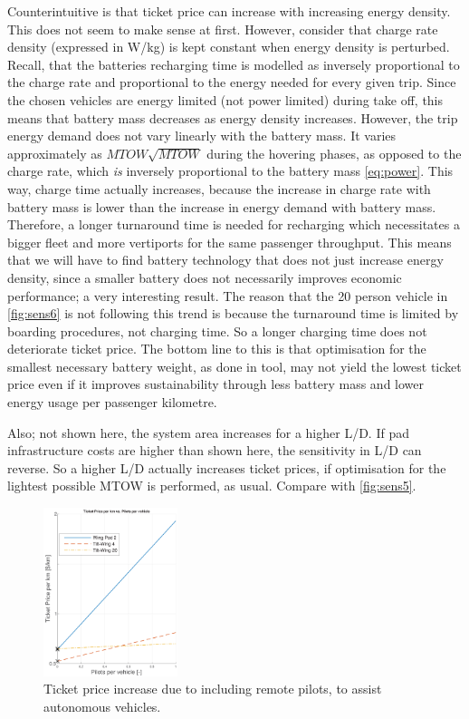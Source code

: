 Counterintuitive is that ticket price can increase with increasing energy density. This does not seem to make sense at first. However, consider that charge rate density (expressed in W/kg) is kept constant when energy density is perturbed. Recall, that the batteries recharging time is modelled as inversely proportional to the charge rate and proportional to the energy needed for every given trip. Since the chosen vehicles are energy limited (not power limited) during take off, this means that battery mass decreases as energy density increases. However, the trip energy demand does not vary linearly with the battery mass. It varies approximately as $MTOW\sqrt{MTOW}$ during the hovering phases, as opposed to the charge rate, which \emph{is} inversely proportional to the battery mass \autoref{eq:power}. This way, charge time actually increases, because the increase in charge rate with battery mass is lower than the increase in energy demand with battery mass. Therefore, a longer turnaround time is needed for recharging which necessitates a bigger fleet and more vertiports for the same passenger throughput. This means that we will have to find battery technology that does not just increase energy density, since a smaller battery does not necessarily improves economic performance; a very interesting result. The reason that the 20 person vehicle in \autoref{fig:sens6} is not following this trend is because the turnaround time is limited by boarding procedures, not charging time. So a longer charging time does not deteriorate ticket price. The bottom line to this is that optimisation for the smallest necessary battery weight, as done in tool, may not yield the lowest ticket price even if it improves sustainability through less battery mass and lower energy usage per passenger kilometre.

Also; not shown here, the system area increases for a higher L/D. If pad infrastructure costs are higher than shown here, the sensitivity in L/D can reverse. So a higher L/D actually increases ticket prices, if optimisation for the lightest possible MTOW is performed, as usual. Compare with \autoref{fig:sens5}.


\begin{figure}
    \centering
    \includegraphics[width=0.35\textwidth]{Figures/autonomous_TPrice_perkm.png}
    \captionsetup{justification=centering}
    \caption{Ticket price increase due to including remote pilots, to assist autonomous vehicles.}
    \label{fig:autocost}
\end{figure}

